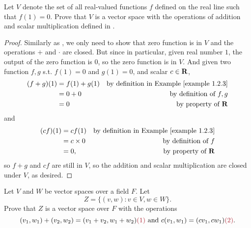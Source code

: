 \begin{exercise} \label{exercise 1.2.20}
Let \(V\) denote the set of all real-valued functions \(f\) defined on the real line such that \(f(1) = 0\).
Prove that \(V\) is a vector space with the operations
of addition and scalar multiplication defined in .
\end{exercise}

\begin{proof}
Similarly as , we only need to show that zero function is in \(V\) and the operations \(+\) and \(\cdot\) are closed.
But since in particular, given real number \(1\), the output of the zero function is \(0\), so the zero function is in \(V\).
And given two function \(f, g\) s.t. \(f(1) = 0\) and \(g(1) = 0\), and scalar \(c \in \mathbf{R}\),
\begin{align*}
    (f + g)(1) & = f(1) + g(1) & \text{by definition in \EXAMPLE{1.2.3}} \\
               & = 0 + 0 & \text{by definition of \(f, g\)} \\
               & = 0 & \text{by property of \(\SET{R}\)}
\end{align*}
and
\begin{align*}
    (cf)(1) & = cf(1) & \text{by definition in \EXAMPLE{1.2.3}} \\
            & = c \X 0 & \text{by definition of \(f\)} \\
            & = 0, & \text{by property of \(\SET{R}\)}
\end{align*}
so \(f + g\) and \(cf\) are still in \(V\), so the addition and scalar multiplication are closed under \(V\), as desired.
\end{proof}

\begin{exercise} \label{exercise 1.2.21}
Let \(V\) and \(W\) be vector spaces over a field \(F\).
Let
\[
    Z = \{ (v, w) : v \in V, w \in W \}.
\]
Prove that \(Z\) is a vector space over \(F\) with the operations
\[
    (v_1, w_1) + (v_2, w_2) = (v_1 + v_2, w_1 + w_2) \MAROON{(1)} \text{ and } c(v_1, w_1) = (c v_1, c w_1) \MAROON{(2)}.
\]
\end{exercise}

